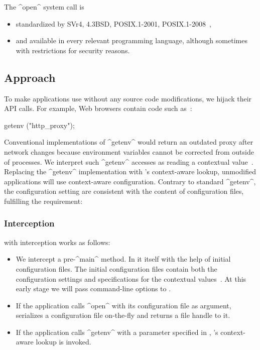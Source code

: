 The ^open^ system call is
\begin{itemize}
\item standardized by SVr4, 4.3BSD, POSIX.1-2001, POSIX.1-2008~\cite{man2017open},
\item and available in every relevant programming language, although sometimes with restrictions for security reasons.
\end{itemize}





\subsection{Approach}

To make applications use \elektra{} without any source code modifications, we hijack their API calls.
For example, Web browsers contain code such as~\cite{raab2017introducing}:

\begin{code}
getenv ("http_proxy");
\end{code}

Conventional implementations of ^getenv^ would return an outdated proxy after network changes because environment variables cannot be corrected from outside of processes.
We interpret such ^getenv^ accesses as reading a contextual value~\cite{raab2017introducing}.
Replacing the ^getenv^ implementation with \elektra{}'s context-aware lookup, unmodified applications will use context-aware configuration.
Contrary to standard ^getenv^, the configuration setting are consistent with the content of configuration files, fulfilling the requirement:
\reqConsistency*


\subsubsection{Interception}

\elektra{} with interception works as follows:
\begin{itemize}
\item We intercept a pre-^main^ method.
In it \elektra{}  itself with the help of initial configuration files.
The initial configuration files contain both the configuration settings and specifications for the contextual values~\cite{raab2017introducing}.
At this early stage we will pass command-line options to \elektra{}.
\item If the application calls ^open^ with its configuration file as argument,
\elektra{} serializes a configuration file on-the-fly and returns a file handle to it.
\item If the application calls ^getenv^ with a parameter specified in ,
\elektra{}'s context-aware lookup is invoked.
\end{itemize}

